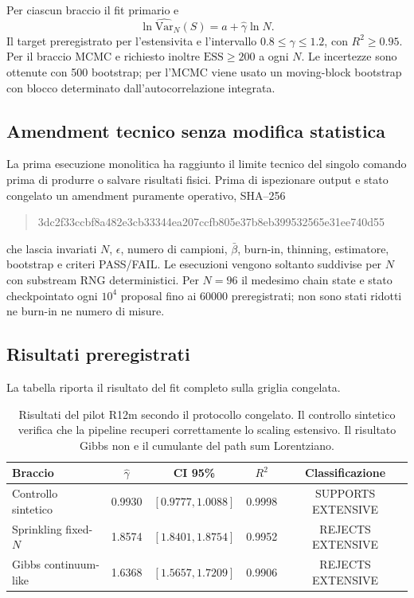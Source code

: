 \documentclass[11pt,a4paper]{article}
\newcommand{\status}[1]{\textsf{#1}}
\begin{document}
Per ciascun braccio il fit primario e
\begin{equation}
\ln \widehat{\mathrm{Var}}_N(S)=a+\widehat\gamma\ln N.
\label{eq:r12m_fit}
\end{equation}
Il target preregistrato per l'estensivita e l'intervallo $0.8\le\gamma\le1.2$, con $R^2\ge0.95$. Per il braccio MCMC e richiesto inoltre $\mathrm{ESS}\ge200$ a ogni $N$. Le incertezze sono ottenute con 500 bootstrap; per l'MCMC viene usato un moving-block bootstrap con blocco determinato dall'autocorrelazione integrata.

\subsection{Amendment tecnico senza modifica statistica}

La prima esecuzione monolitica ha raggiunto il limite tecnico del singolo comando prima di produrre o salvare risultati fisici. Prima di ispezionare output e stato congelato un amendment puramente operativo, SHA--256
\begin{quote}\ttfamily
3dc2f33ccbf8a482e3cb33344ea207ccfb805e37b8eb399532565e31ee740d55
\end{quote}
che lascia invariati $N$, $\epsilon$, numero di campioni, $\bar\beta$, burn-in, thinning, estimatore, bootstrap e criteri PASS/FAIL. Le esecuzioni vengono soltanto suddivise per $N$ con substream RNG deterministici. Per $N=96$ il medesimo chain state e stato checkpointato ogni $10^4$ proposal fino ai $60000$ preregistrati; non sono stati ridotti ne burn-in ne numero di misure.

\subsection{Risultati preregistrati}

La tabella riporta il risultato del fit completo sulla griglia congelata.
\begin{table}[htbp]
\centering
\small
\begin{tabular}{lcccc}
\toprule
Braccio & $\widehat\gamma$ & CI 95\% & $R^2$ & Classificazione \\
\midrule
Controllo sintetico & 0.9930 & $[0.9777,1.0088]$ & 0.9998 & \status{SUPPORTS EXTENSIVE} \\
Sprinkling fixed-$N$ & 1.8574 & $[1.8401,1.8754]$ & 0.9952 & \status{REJECTS EXTENSIVE} \\
Gibbs continuum-like & 1.6368 & $[1.5657,1.7209]$ & 0.9906 & \status{REJECTS EXTENSIVE} \\
\bottomrule
\end{tabular}
\caption{Risultati del pilot R12m secondo il protocollo congelato. Il controllo sintetico verifica che la pipeline recuperi correttamente lo scaling estensivo. Il risultato Gibbs non e il cumulante del path sum Lorentziano.}
\label{tab:r12m_results}
\end{table}
\end{document}
